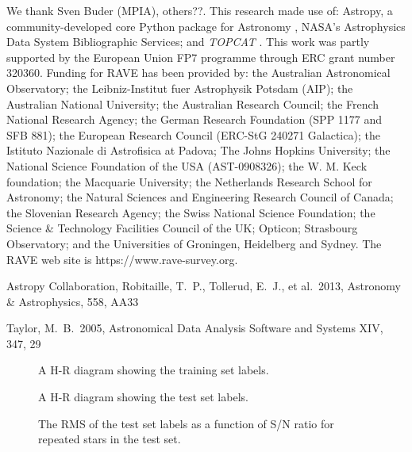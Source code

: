 \documentclass[preprint2,trackchanges]{aastex}
\newcommand{\project}[1]{\textsl{#1}}
\begin{document}
\acknowledgements
We thank Sven Buder (MPIA), others??.
This research made use of: Astropy, a community-developed core Python package for
Astronomy \citep{astropy}, NASA's Astrophysics Data System Bibliographic Services;
 and \project{TOPCAT} \citep{Taylor2005}.
This work was partly supported by the European Union FP7 programme through ERC 
grant number 320360.
Funding for RAVE has been provided by: the Australian Astronomical Observatory; the Leibniz-Institut fuer Astrophysik Potsdam (AIP); the Australian National University; the Australian Research Council; the French National Research Agency; the German Research Foundation (SPP 1177 and SFB 881); the European Research Council (ERC-StG 240271 Galactica); the Istituto Nazionale di Astrofisica at Padova; The Johns Hopkins University; the National Science Foundation of the USA (AST-0908326); the W. M. Keck foundation; the Macquarie University; the Netherlands Research School for Astronomy; the Natural Sciences and Engineering Research Council of Canada; the Slovenian Research Agency; the Swiss National Science Foundation; the Science \& Technology Facilities Council of the UK; Opticon; Strasbourg Observatory; and the Universities of Groningen, Heidelberg and Sydney. The RAVE web site is https://www.rave-survey.org.  



\begin{thebibliography}{dummy}
 Astropy Collaboration, Robitaille, T.~P., Tollerud, E.~J., et al.\ 2013, Astronomy \& Astrophysics, 558, AA33

 Taylor, M.~B.\ 2005, Astronomical Data Analysis Software and Systems XIV, 347, 29 

\end{thebibliography}

\clearpage

\begin{figure}[p]
\caption{A H-R diagram showing the training set labels.\label{fig:training-set-hrd}}
\end{figure}

\begin{figure}[p]
\caption{A H-R diagram showing the test set labels.\label{fig:test-set-hrd}}
\end{figure}

\begin{figure}[p]
\caption{The RMS of the test set labels as a function of S/N ratio for repeated stars in the test set.\label{fig:test-set-repeats}}
\end{figure}
\end{document}
